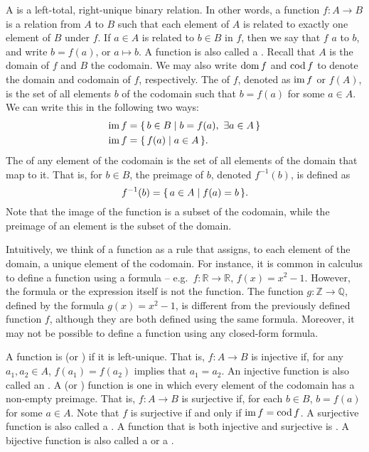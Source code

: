 A  is a left-total, right-unique binary relation. In other words, a function $f \colon A \to B$ is a relation from $A$ to $B$ such that each element of $A$ is related to exactly one element of $B$ under $f$. If $a \in A$ is related to $b \in B$ in $f$, then we say that $f$  $a$ to $b$, and write $b = f(a)$, or $a \mapsto b$. A function is also called a . Recall that $A$ is the domain of $f$ and $B$ the codomain. We may also write $\operatorname{dom} f$ and $\operatorname{cod} f$ to denote the domain and codomain of $f$, respectively. The  of $f$, denoted as $\operatorname{im} f$ or $f(A)$, is the set of all elements $b$ of the codomain such that $b = f(a)$ for some $a \in A$. We can write this in the following two ways:
\begin{align*}
\operatorname{im} f & = \qty{\, b \in B \mid b = f(a),~ \exists a \in A \,} \\
\operatorname{im} f & = \qty{\, f(a) \mid a \in A \,}.
\end{align*}
The  of any element of the codomain is the set of all elements of the domain that map to it. That is, for $b \in B$, the preimage of $b$, denoted $f^{-1}(b)$, is defined as
\begin{equation*}
f^{-1}(b) = \qty{\, a \in A \mid f(a) = b \,}.
\end{equation*}
Note that the image of the function is a subset of the codomain, while the preimage of an element is the subset of the domain.

\begin{Note*}
Intuitively, we think of a function as a rule that assigns, to each element of the domain, a unique element of the codomain. For instance, it is common in calculus to define a function using a formula -- e.g.\ $f \colon \mathbb R \to \mathbb R$, $f(x) = x^2 - 1$. However, the formula or the expression itself is not the function. The function $g \colon \mathbb Z \to \mathbb Q$, defined by the formula $g(x) = x^2 - 1$, is different from the previously defined function $f$, although they are both defined using the same formula. Moreover, it may not be possible to define a function using any closed-form formula.
\end{Note*}

A function is  (or ) if it is left-unique. That is, $f \colon A \to B$ is injective if, for any $a_1, a_2 \in A$, $f(a_1) = f(a_2)$ implies that $a_1 = a_2$. An injective function is also called an . A  (or ) function is one in which every element of the codomain has a non-empty preimage. That is, $f \colon A \to B$ is surjective if, for each $b \in B$, $b = f(a)$ for some $a \in A$. Note that $f$ is surjective if and only if $\operatorname{im} f = \operatorname{cod} f$. A surjective function is also called a . A function that is both injective and surjective is . A bijective function is also called a  or a .

